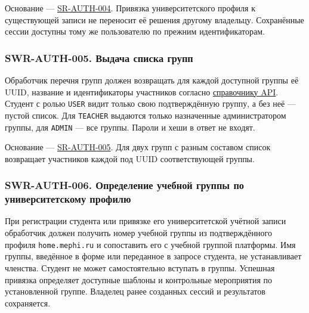 \documentclass[12pt,a4paper]{article}
\begin{document}
Основание --- {\href{../04\_Системные\_требования/DOC-05\_Системные\_требования.pdf\#sr-auth-004}{SR-AUTH-004}}. Привязка университетского профиля к существующей записи не переносит её решения другому владельцу. Сохранённые сессии доступны тому же пользователю по прежним идентификаторам.

\subsubsection{SWR-AUTH-005. Выдача списка групп}\label{swr-auth-005-ux432ux44bux434ux430ux447ux430-ux441ux43fux438ux441ux43aux430-ux433ux440ux443ux43fux43f}

\hypertarget{swr-auth-005-выдача-списка-групп}{}

\hypertarget{swr-auth-005}{}

Обработчик перечня групп должен возвращать для каждой доступной группы её UUID, название и идентификаторы участников согласно {\href{../09\_Архитектура\_и\_API/DOC-08\_Справочник\_API.pdf\#doc-08-справочник-api-платформы}{справочнику API}}. Студент с ролью \texttt{USER} видит только свою подтверждённую группу, а без неё --- пустой список. Для \texttt{TEACHER} выдаются только назначенные администратором группы, для \texttt{ADMIN} --- все группы. Пароли и хеши в ответ не входят.

Основание --- {\href{../04\_Системные\_требования/DOC-05\_Системные\_требования.pdf\#sr-auth-005}{SR-AUTH-005}}. Для двух групп с разным составом список возвращает участников каждой под UUID соответствующей группы.

\subsubsection{SWR-AUTH-006. Определение учебной группы по университетскому профилю}\label{swr-auth-006-ux43eux43fux440ux435ux434ux435ux43bux435ux43dux438ux435-ux443ux447ux435ux431ux43dux43eux439-ux433ux440ux443ux43fux43fux44b-ux43fux43e-ux443ux43dux438ux432ux435ux440ux441ux438ux442ux435ux442ux441ux43aux43eux43cux443-ux43fux440ux43eux444ux438ux43bux44e}

\hypertarget{swr-auth-006-определение-учебной-группы-по-университетскому-профилю}{}

\hypertarget{swr-auth-006}{}

При регистрации студента или привязке его университетской учётной записи обработчик должен получить номер учебной группы из подтверждённого профиля \texttt{home.\allowbreak{}mephi.\allowbreak{}ru} и сопоставить его с учебной группой платформы. Имя группы, введённое в форме или переданное в запросе студента, не устанавливает членства. Студент не может самостоятельно вступать в группы. Успешная привязка определяет доступные шаблоны и контрольные мероприятия по установленной группе. Владелец ранее созданных сессий и результатов сохраняется.
\end{document}
